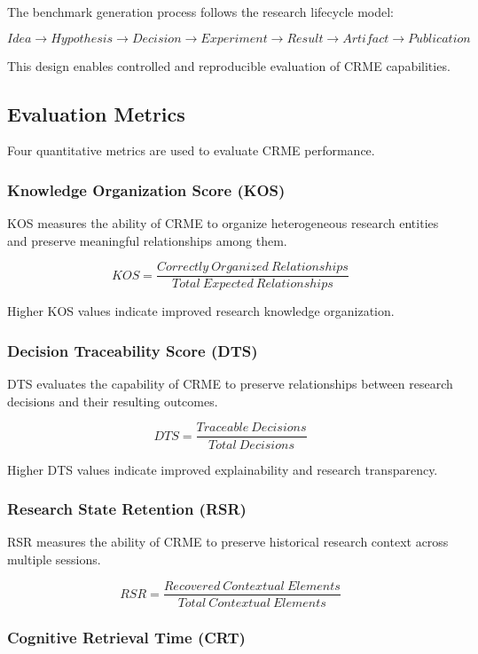 The benchmark generation process follows the research lifecycle model:

\[
Idea
\rightarrow
Hypothesis
\rightarrow
Decision
\rightarrow
Experiment
\rightarrow
Result
\rightarrow
Artifact
\rightarrow
Publication
\]

This design enables controlled and reproducible evaluation of CRME capabilities.


\subsection{Evaluation Metrics}

Four quantitative metrics are used to evaluate CRME performance.


\subsubsection{Knowledge Organization Score (KOS)}

KOS measures the ability of CRME to organize heterogeneous research entities and preserve meaningful relationships among them.

\[
KOS =
\frac{Correctly\ Organized\ Relationships}
{Total\ Expected\ Relationships}
\]

Higher KOS values indicate improved research knowledge organization.


\subsubsection{Decision Traceability Score (DTS)}

DTS evaluates the capability of CRME to preserve relationships between research decisions and their resulting outcomes.

\[
DTS =
\frac{Traceable\ Decisions}
{Total\ Decisions}
\]

Higher DTS values indicate improved explainability and research transparency.


\subsubsection{Research State Retention (RSR)}

RSR measures the ability of CRME to preserve historical research context across multiple sessions.

\[
RSR =
\frac{Recovered\ Contextual\ Elements}
{Total\ Contextual\ Elements}
\]


\subsubsection{Cognitive Retrieval Time (CRT)}

